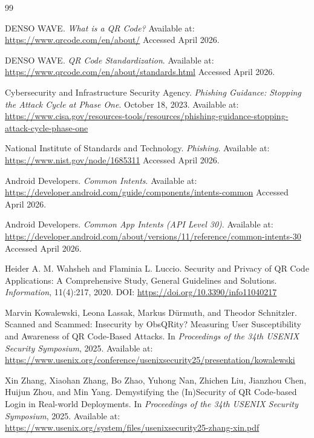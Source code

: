 \documentclass[11pt]{article}
\begin{document}
\begin{thebibliography}{99}

DENSO WAVE.
\newblock \emph{What is a QR Code?}
\newblock Available at: \url{https://www.qrcode.com/en/about/}
\newblock Accessed April 2026.

DENSO WAVE.
\newblock \emph{QR Code Standardization}.
\newblock Available at: \url{https://www.qrcode.com/en/about/standards.html}
\newblock Accessed April 2026.

Cybersecurity and Infrastructure Security Agency.
\newblock \emph{Phishing Guidance: Stopping the Attack Cycle at Phase One}.
\newblock October 18, 2023.
\newblock Available at: \url{https://www.cisa.gov/resources-tools/resources/phishing-guidance-stopping-attack-cycle-phase-one}

National Institute of Standards and Technology.
\newblock \emph{Phishing}.
\newblock Available at: \url{https://www.nist.gov/node/1685311}
\newblock Accessed April 2026.

Android Developers.
\newblock \emph{Common Intents}.
\newblock Available at: \url{https://developer.android.com/guide/components/intents-common}
\newblock Accessed April 2026.

Android Developers.
\newblock \emph{Common App Intents (API Level 30)}.
\newblock Available at: \url{https://developer.android.com/about/versions/11/reference/common-intents-30}
\newblock Accessed April 2026.

Heider A. M. Wahsheh and Flaminia L. Luccio.
\newblock Security and Privacy of QR Code Applications: A Comprehensive Study, General Guidelines and Solutions.
\newblock \emph{Information}, 11(4):217, 2020.
\newblock DOI: \url{https://doi.org/10.3390/info11040217}

Marvin Kowalewski, Leona Lassak, Markus D\"{u}rmuth, and Theodor Schnitzler.
\newblock Scanned and Scammed: Insecurity by ObsQRity? Measuring User Susceptibility and Awareness of QR Code-Based Attacks.
\newblock In \emph{Proceedings of the 34th USENIX Security Symposium}, 2025.
\newblock Available at: \url{https://www.usenix.org/conference/usenixsecurity25/presentation/kowalewski}

Xin Zhang, Xiaohan Zhang, Bo Zhao, Yuhong Nan, Zhichen Liu, Jianzhou Chen, Huijun Zhou, and Min Yang.
\newblock Demystifying the (In)Security of QR Code-based Login in Real-world Deployments.
\newblock In \emph{Proceedings of the 34th USENIX Security Symposium}, 2025.
\newblock Available at: \url{https://www.usenix.org/system/files/usenixsecurity25-zhang-xin.pdf}


\end{thebibliography}
\end{document}
